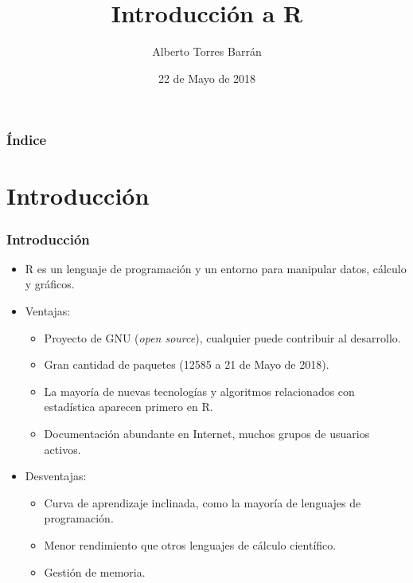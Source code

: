 \documentclass{beamer}
\title{Introducción a R}
\author{Alberto Torres Barrán}
\date{22 de Mayo de 2018}
\begin{document}
\begin{frame}[plain]
\titlepage
\end{frame}

\begin{frame}[allowframebreaks]
	\frametitle{Índice}
    \tableofcontents[sections={1-4}]
      \framebreak
    \tableofcontents[sections={5-9}]
\end{frame}


\section{Introducción}

\begin{frame}
\frametitle{Introducción}

\begin{itemize}
\item R es un lenguaje de programación y un entorno para manipular datos, cálculo y gráficos.
\item Ventajas:
\begin{itemize}
\item Proyecto de GNU (\textit{open source}), cualquier puede contribuir al desarrollo.
\item Gran cantidad de paquetes (12585 a 21 de Mayo de 2018).
\item La mayoría de nuevas tecnologías y algoritmos relacionados con estadística aparecen primero en R.
\item Documentación abundante en Internet, muchos grupos de usuarios activos.
\end{itemize}
\item Desventajas:
\begin{itemize}
\item Curva de aprendizaje inclinada, como la mayoría de lenguajes de programación.
\item Menor rendimiento que otros lenguajes de cálculo científico.
\item Gestión de memoria.
\end{itemize}
\end{itemize}

\end{frame}
\end{document}
